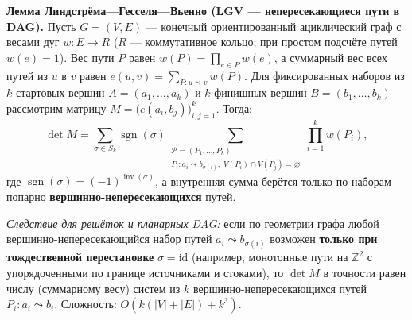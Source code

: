 \documentclass[10pt,a4paper]{article}
\renewcommand{\emptyset}{\varnothing}
\newcommand{\Z}{\mathbb{Z}}
\DeclareMathOperator{\inv}{inv}
\DeclareMathOperator{\sgn}{sgn}
\begin{document}
\textbf{Лемма Линдстрёма—Гесселя—Вьенно (LGV — непересекающиеся пути в DAG).} Пусть $G = (V, E)$ — конечный ориентированный ациклический граф с весами дуг $w : E \to R$ ($R$ — коммутативное кольцо; при простом подсчёте путей $w(e) = 1$). Вес пути $P$ равен $w(P) = \prod_{e \in P} w(e)$, а суммарный вес всех путей из $u$ в $v$ равен $e(u, v) = \sum_{P : u \leadsto v} w(P)$. Для фиксированных наборов из $k$ стартовых вершин $A = (a_1, \dots, a_k)$ и $k$ финишных вершин $B = (b_1, \dots, b_k)$ рассмотрим матрицу $M = \bigl(e(a_i, b_j)\bigr)_{i,j=1}^k$. Тогда:
\[
  \det M = \sum_{\sigma \in S_k} \sgn(\sigma) \sum_{\substack{\mathcal{P} = (P_1, \dots, P_k) \\ P_i : a_i \leadsto b_{\sigma(i)},\; V(P_i) \cap V(P_j) = \emptyset}} \prod_{i=1}^{k} w(P_i),
\]
где $\sgn(\sigma) = (-1)^{\inv(\sigma)}$, а внутренняя сумма берётся только по наборам попарно \textbf{вершинно-непересекающихся} путей.

\emph{Следствие для решёток и планарных DAG:} если по геометрии графа любой вершинно-непересекающийся набор путей $a_i \leadsto b_{\sigma(i)}$ возможен \textbf{только при тождественной перестановке} $\sigma = \mathrm{id}$ (например, монотонные пути на $\Z^2$ с упорядоченными по границе источниками и стоками), то $\det M$ в точности равен числу (суммарному весу) систем из $k$ вершинно-непересекающихся путей $P_i : a_i \leadsto b_i$. Сложность: $O(k(|V| + |E|) + k^3)$.
\end{document}
